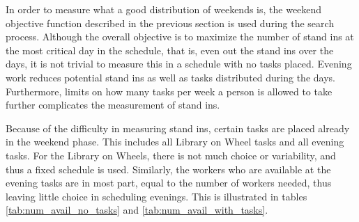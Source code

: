 In order to measure what a good distribution of weekends is, the weekend objective function described in the previous section is used during the search process. Although the overall objective is to maximize the number of stand ins at the most critical day in the schedule, that is, even out the stand ins over the days, it is not trivial to measure this in a schedule with no tasks placed. Evening work reduces potential stand ins as well as tasks distributed during the days. Furthermore, limits on how many tasks per week a person is allowed to take further complicates the measurement of stand ins.

Because of the difficulty in measuring stand ins, certain tasks are placed already in the weekend phase. This includes all Library on Wheel tasks and all evening tasks. For the Library on Wheels, there is not much choice or variability, and thus a fixed schedule is used. Similarly, the workers who are available at the evening tasks are in most part, equal to the number of workers needed, thus leaving little choice in scheduling evenings. This is illustrated in tables \ref{tab:num_avail_no_tasks} and \ref{tab:num_avail_with_tasks}.

